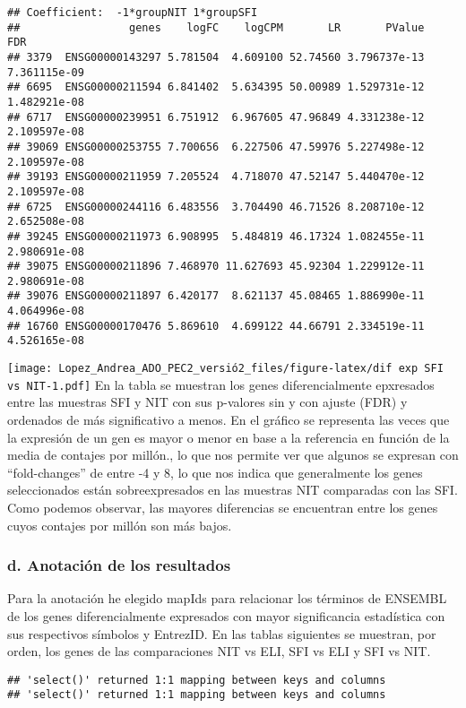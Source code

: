 \documentclass[
]{article}
\begin{document}
\begin{verbatim}
## Coefficient:  -1*groupNIT 1*groupSFI 
##                 genes    logFC    logCPM       LR       PValue          FDR
## 3379  ENSG00000143297 5.781504  4.609100 52.74560 3.796737e-13 7.361115e-09
## 6695  ENSG00000211594 6.841402  5.634395 50.00989 1.529731e-12 1.482921e-08
## 6717  ENSG00000239951 6.751912  6.967605 47.96849 4.331238e-12 2.109597e-08
## 39069 ENSG00000253755 7.700656  6.227506 47.59976 5.227498e-12 2.109597e-08
## 39193 ENSG00000211959 7.205524  4.718070 47.52147 5.440470e-12 2.109597e-08
## 6725  ENSG00000244116 6.483556  3.704490 46.71526 8.208710e-12 2.652508e-08
## 39245 ENSG00000211973 6.908995  5.484819 46.17324 1.082455e-11 2.980691e-08
## 39075 ENSG00000211896 7.468970 11.627693 45.92304 1.229912e-11 2.980691e-08
## 39076 ENSG00000211897 6.420177  8.621137 45.08465 1.886990e-11 4.064996e-08
## 16760 ENSG00000170476 5.869610  4.699122 44.66791 2.334519e-11 4.526165e-08
\end{verbatim}

\texttt{[image: Lopez\_Andrea\_ADO\_PEC2\_versió2\_files/figure-latex/dif exp SFI vs NIT-1.pdf]}
En la tabla se muestran los genes diferencialmente epxresados entre las
muestras SFI y NIT con sus p-valores sin y con ajuste (FDR) y ordenados
de más significativo a menos. En el gráfico se representa las veces que
la expresión de un gen es mayor o menor en base a la referencia en
función de la media de contajes por millón., lo que nos permite ver que
algunos se expresan con ``fold-changes'' de entre -4 y 8, lo que nos
indica que generalmente los genes seleccionados están sobreexpresados en
las muestras NIT comparadas con las SFI. Como podemos observar, las
mayores diferencias se encuentran entre los genes cuyos contajes por
millón son más bajos.

\subsubsection{d. Anotación de los resultados}

Para la anotación he elegido mapIds para relacionar los términos de
ENSEMBL de los genes diferencialmente expresados con mayor significancia
estadística con sus respectivos símbolos y EntrezID. En las tablas
siguientes se muestran, por orden, los genes de las comparaciones NIT vs
ELI, SFI vs ELI y SFI vs NIT.

\begin{verbatim}
## 'select()' returned 1:1 mapping between keys and columns
## 'select()' returned 1:1 mapping between keys and columns
\end{verbatim}
\end{document}
